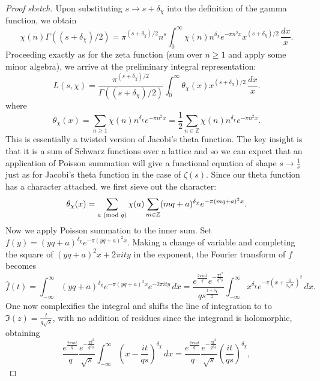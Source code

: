 \documentclass[12pt,reqno]{amsart}
\theoremstyle{definition}
\numberwithin{equation}{section}
\renewcommand{\mod}[1]{{\ifmmode\text{\rm\ (mod~$#1$)}\else\discretionary{}{}{\hbox{ }}\rm(mod~$#1$)\fi}}
\newcommand{\Z}{{\mathbb Z}}
\begin{document}
    \begin{proof}[Proof sketch]         
        Upon substituting $s \to s+\delta_{\chi}$ into the definition of the gamma function, we obtain
        \[
            \chi(n)\Gamma\left((s+\delta_{\chi})/2\right) = \pi^{(s+\delta_{\chi})/2}n^{s}\int_{0}^{\infty}\chi(n)n^{\delta_{\chi}}e^{-\pi n^{2}x}x^{(s+\delta_{\chi})/2}\,\frac{dx}{x}.
        \]
        Proceeding exactly as for the zeta function (sum over $n \ge 1$ and apply some minor algebra), we arrive at the preliminary integral representation:
        \begin{equation}\label{equ:prelim_int_rep}
            L(s,\chi) = \frac{\pi^{(s+\delta_{\chi})/2}}{\Gamma\left((s+\delta_{\chi})/2\right)}\int_{0}^{\infty}\theta_{\chi}(x)x^{(s+\delta_{\chi})/2}\,\frac{dx}{x}.
        \end{equation}
        where
        \[
            \theta_{\chi}(x) = \sum_{n \ge 1}\chi(n)n^{\delta_{\chi}}e^{-\pi n^{2}x} = \frac{1}{2}\sum_{n \in \Z}\chi(n)n^{\delta_{\chi}}e^{-\pi n^{2}x}.
        \]
        This is essentially a twisted version of Jacobi's theta function. The key insight is that it is a sum of Schwarz functions over a lattice and so we can expect that an application of Poisson summation will give a functional equation of shape $s \to \frac{1}{s}$ just as for Jacobi's theta function in the case of $\zeta(s)$. Since our theta function has a character attached, we first sieve out the character:
        \[
            \theta_{\chi}(x) = \sum_{a \mod{q}}\chi(a)\sum_{m \in \Z}(mq+a)^{\delta_{\chi}}e^{-\pi(mq+a)^{2}x}.
        \]
        Now we apply Poisson summation to the inner sum. Set $f(y)
     = (yq+a)^{\delta_{\chi}}e^{-\pi(yq+a)^{2}x}$. Making a change of variable and completing the square of $(yq+a)^{2}x+2\pi ity$ in the exponent, the Fourier transform of $f$ becomes
     \[
        \hat{f}(t) = \int_{-\infty}^{\infty}(yq+a)^{\delta_{\chi}}e^{-\pi(yq+a)^{2}x}e^{-2\pi ity}\,dx = \frac{e^{\frac{2\pi iat}{q}}e^{-\frac{\pi t^{2}}{q^{2}s}}}{qs^{\frac{1+\delta_{\chi}}{2}}}\int_{-\infty}^{\infty}x^{\delta_{\chi}}e^{-\pi\left(x+\frac{it}{q\sqrt{s}}\right)^{2}}\,dx.
     \]
     One now complexifies the integral and shifts the line of integration to to $\Im(z) = \frac{t}{q\sqrt{s}}$, with no addition of residues since the integrand is holomorphic, obtaining
     \[
         \frac{e^{\frac{2\pi iat}{q}}}{q}\frac{e^{-\frac{\pi t^{2}}{q^{2}s}}}{\sqrt{s}}\int_{-\infty}^{\infty}\left(x-\frac{it}{qs}\right)^{\delta_{\chi}}\,dx = \frac{e^{\frac{2\pi iat}{q}}}{q}\frac{e^{-\frac{\pi t^{2}}{q^{2}s}}}{\sqrt{s}}\left(\frac{it}{qs}\right)^{\delta_{\chi}},
\]
\end{proof}
\end{document}

